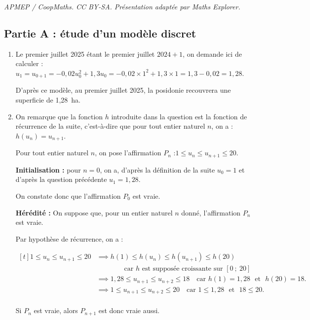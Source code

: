 \documentclass[10pt]{article}
\providecommand{\np}[2][]{{#2~#1}}
\begin{document}
\noindent\textit{APMEP / CoopMaths. CC BY-SA. Présentation adaptée par Maths Explorer.}\par\medskip
\medskip
\subsection*{Partie A : étude d'un modèle discret}

\begin{enumerate}
	\item Le premier juillet 2025 étant le premier juillet $2024 + 1$, on demande ici de calculer :
	$u_1 = u_{0 + 1} = -0,02u_0^2 + 1,3u_0 = -0,02\times 1^2 + 1,3 \times 1 = 1,3-0,02 = 1,28$.

	D'après ce modèle, au premier juillet 2025, la posidonie recouvrera une superficie de \np[ha]{1,28}.

	\item On remarque que la fonction $h$ introduite dans la question est la fonction de récurrence de la suite, c'est-à-dire que pour tout entier naturel $n$, on a : $h(u_n)= u_{n+1}$.

	Pour tout entier naturel $n$, on pose l'affirmation $P_n$ :\quad \og $1 \leqslant u_n \leqslant u_{n+1} \leqslant 20$.\fg{}

	\textbf{Initialisation : } pour $n = 0$, on a, d'après la définition de la suite $u_0 = 1$ et d'après la question précédente $u_1 = 1,28$.

	On constate donc que l'affirmation $P_0$ est vraie.

	\textbf{Hérédité :} On suppose que, pour un entier naturel $n$ donné, l'affirmation $P_n$ est vraie.

	Par hypothèse de récurrence, on a :

	$\begin{aligned}[t] 1 \leqslant u_n \leqslant u_{n+1} \leqslant 20
		&\implies h(1) \leqslant h(u_n) \leqslant h(u_{n+1}) \leqslant h(20)\\
		&\qquad \qquad \text{car $h$ est supposée croissante sur }[0~;~20]\\
		&\implies 1,28 \leqslant u_{n+1} \leqslant u_{n+2} \leqslant 18 \quad \text{car } h(1) = 1,28 \text{~ et ~} h(20) = 18.\\
		&\implies 1 \leqslant u_{n+1} \leqslant u_{n+2} \leqslant 20 \quad \text{car } 1 \leqslant 1,28 \text{~ et ~} 18 \leqslant 20.\\
	\end{aligned}$

	Si $P_n$ est vraie, alors $P_{n+1}$ est donc vraie aussi.


\end{enumerate}
\end{document}
